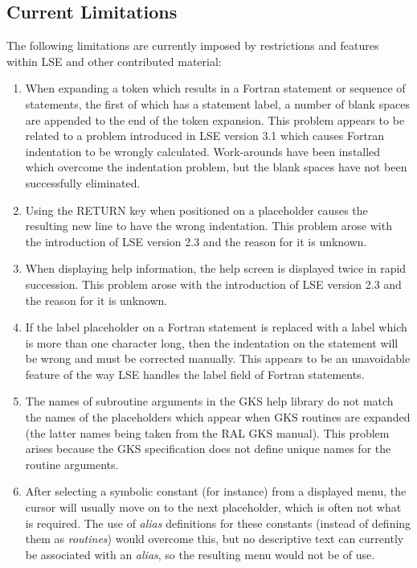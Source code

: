 
\subsection{Current Limitations}

The following limitations are currently imposed by restrictions and features
within \mbox{LSE} and other contributed material:

\begin{enumerate}

\item When expanding a token which results in a Fortran statement or sequence of
statements, the first of which has a statement label, a number of blank spaces
are appended to the end of the token expansion.  This problem appears to be
related to a problem introduced in LSE version 3.1 which causes Fortran
indentation to be wrongly calculated.  Work-arounds have been installed which
overcome the indentation problem, but the blank spaces have not been
successfully eliminated.

\item Using the RETURN key when positioned on a placeholder causes the
resulting new line to have the wrong indentation.
This problem arose with the introduction of LSE version 2.3 and the reason for
it is unknown.

\item When displaying help information, the help screen is displayed twice
in rapid succession.
This problem arose with the introduction of LSE version 2.3 and the reason for
it is unknown.

\item If the label placeholder on a Fortran statement is replaced with a
label which is more than one character long, then the indentation on the
statement will be wrong and must be corrected manually.
This appears to be an unavoidable feature of the way LSE handles the label
field of Fortran statements.

\item The names of subroutine arguments in the \mbox{GKS} help library do
not match the names of the placeholders which appear when \mbox{GKS}
routines are expanded (the latter names being taken from the \mbox{RAL}
\mbox{GKS} manual).
This problem arises because the GKS specification does not define unique
names for the routine arguments.

\item After selecting a symbolic constant (for instance) from a displayed
menu, the cursor will usually move on to the next placeholder, which is
often not what is required.
The use of {\em alias} definitions for these constants (instead of defining
them as {\em routines}) would overcome this, but no descriptive text can
currently be associated with an {\em alias}, so the resulting menu would not
be of use.

\end{enumerate}



